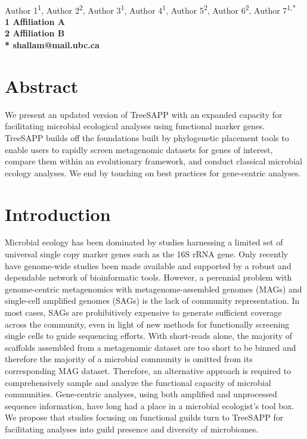 \documentclass[10pt,letterpaper]{article}
\begin{document}
\vspace*{0.35in}

\begin{flushleft}
{\Large
\textbf{}
}
\newline
\\
Author 1\textsuperscript{1},
Author 2\textsuperscript{2},
Author 3\textsuperscript{1},
Author 4\textsuperscript{1},
Author 5\textsuperscript{2},
Author 6\textsuperscript{2},
Author 7\textsuperscript{1,*}
\\
\bigskip
\bf{1} Affiliation A
\\
\bf{2} Affiliation B
\\
\bigskip
* shallam@mail.ubc.ca

\end{flushleft}

\section*{Abstract}
We present an updated version of TreeSAPP with an expanded capacity for facilitating microbial ecological analyses using functional marker genes. TreeSAPP builds off the foundations built by phylogenetic placement tools to enable users to rapidly screen metagenomic datasets for genes of interest, compare them within an evolutionary framework, and conduct classical microbial ecology analyses. We end by touching on best practices for gene-centric analyses.

\linenumbers

\section*{Introduction}
	Microbial ecology has been dominated by studies harnessing a limited set of universal single copy marker genes such as the 16S rRNA gene. Only recently have genome-wide studies been made available and supported by a robust and dependable network of bioinformatic tools. However, a perennial problem with genome-centric metagenomics with metagenome-assembled genomes (MAGs) and single-cell amplified genomes (SAGs) is the lack of community representation. In most cases, SAGs are prohibitively expensive to generate sufficient coverage across the community, even in light of new methods for functionally screening single cells to guide sequencing efforts. With short-reads alone, the majority of scaffolds assembled from a metagenomic dataset are too short to be binned and therefore the majority of a microbial community is omitted from its corresponding MAG dataset. Therefore, an alternative approach is required to comprehensively sample and analyze the functional capacity of microbial communities.
	Gene-centric analyses, using both amplified and unprocessed sequence information, have long had a place in a microbial ecologist's tool box. We propose that studies focusing on functional guilds turn to TreeSAPP for facilitating analyses into guild presence and diversity of microbiomes.
\end{document}
